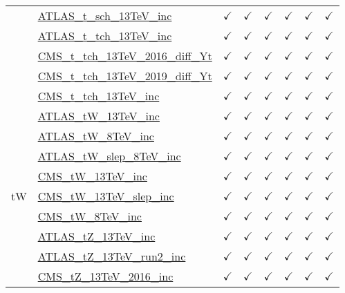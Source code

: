 \documentclass{article}
\begin{document}
\begin{longtable}{|c|l|c|c|c|c|c|c|}
 & \href{https://arxiv.org}{ATLAS_t_sch_13TeV_inc}  & $\checkmark$ & $\checkmark$ & $\checkmark$ & $\checkmark$ & $\checkmark$ & $\checkmark$\\ \cline{2-8}
 & \href{https://arxiv.org}{ATLAS_t_tch_13TeV_inc}  & $\checkmark$ & $\checkmark$ & $\checkmark$ & $\checkmark$ & $\checkmark$ & $\checkmark$\\ \cline{2-8}
 & \href{https://arxiv.org}{CMS_t_tch_13TeV_2016_diff_Yt}  & $\checkmark$ & $\checkmark$ & $\checkmark$ & $\checkmark$ & $\checkmark$ & $\checkmark$\\ \cline{2-8}
 & \href{https://arxiv.org}{CMS_t_tch_13TeV_2019_diff_Yt}  & $\checkmark$ & $\checkmark$ & $\checkmark$ & $\checkmark$ & $\checkmark$ & $\checkmark$\\ \cline{2-8}
 & \href{https://arxiv.org}{CMS_t_tch_13TeV_inc}  & $\checkmark$ & $\checkmark$ & $\checkmark$ & $\checkmark$ & $\checkmark$ & $\checkmark$
\\ \hline
\multirow{11}{*}{tW}
 & \href{https://arxiv.org}{ATLAS_tW_13TeV_inc}  & $\checkmark$ & $\checkmark$ & $\checkmark$ & $\checkmark$ & $\checkmark$ & $\checkmark$\\ \cline{2-8}
 & \href{https://arxiv.org}{ATLAS_tW_8TeV_inc}  & $\checkmark$ & $\checkmark$ & $\checkmark$ & $\checkmark$ & $\checkmark$ & $\checkmark$\\ \cline{2-8}
 & \href{https://arxiv.org}{ATLAS_tW_slep_8TeV_inc}  & $\checkmark$ & $\checkmark$ & $\checkmark$ & $\checkmark$ & $\checkmark$ & $\checkmark$\\ \cline{2-8}
 & \href{https://arxiv.org}{CMS_tW_13TeV_inc}  & $\checkmark$ & $\checkmark$ & $\checkmark$ & $\checkmark$ & $\checkmark$ & $\checkmark$\\ \cline{2-8}
 & \href{https://arxiv.org}{CMS_tW_13TeV_slep_inc}  & $\checkmark$ & $\checkmark$ & $\checkmark$ & $\checkmark$ & $\checkmark$ & $\checkmark$\\ \cline{2-8}
 & \href{https://arxiv.org}{CMS_tW_8TeV_inc}  & $\checkmark$ & $\checkmark$ & $\checkmark$ & $\checkmark$ & $\checkmark$ & $\checkmark$\\ \cline{2-8}
 & \href{https://arxiv.org}{ATLAS_tZ_13TeV_inc}  & $\checkmark$ & $\checkmark$ & $\checkmark$ & $\checkmark$ & $\checkmark$ & $\checkmark$\\ \cline{2-8}
 & \href{https://arxiv.org}{ATLAS_tZ_13TeV_run2_inc}  & $\checkmark$ & $\checkmark$ & $\checkmark$ & $\checkmark$ & $\checkmark$ & $\checkmark$\\ \cline{2-8}
 & \href{https://arxiv.org}{CMS_tZ_13TeV_2016_inc}  & $\checkmark$ & $\checkmark$ & $\checkmark$ & $\checkmark$ & $\checkmark$ & $\checkmark$\\ \cline{2-8}

\end{longtable}
\end{document}
